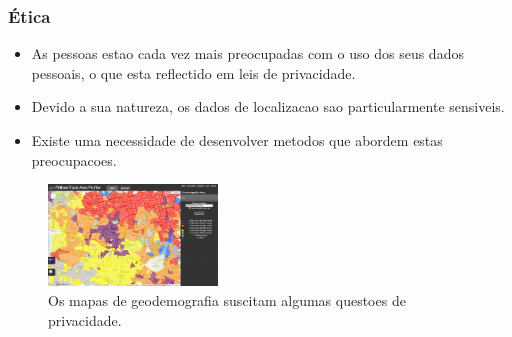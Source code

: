 \documentclass[hyperref={pdfpagelabels=true}]{beamer}
\begin{document}
\begin{frame}
\frametitle{\'{E}tica}

    \begin{itemize}
        \item<2->As pessoas estao cada vez mais preocupadas com o uso dos seus dados pessoais, o que esta reflectido em leis de privacidade.
        \item<3->Devido a sua natureza, os dados de localizacao sao particularmente sensiveis.
        \item<4->Existe uma necessidade de desenvolver metodos que abordem estas preocupacoes.
    \end{itemize}                      
    
        \begin{figure}   
            \includegraphics[width=0.4\textwidth]{geodemographics.jpg}\\
            \tiny{Os mapas de geodemografia suscitam algumas questoes de privacidade.}%
        \end{figure} 

\end{frame}
\end{document}
